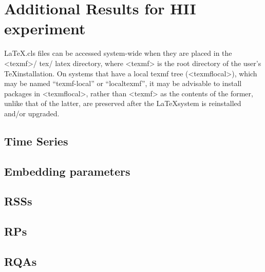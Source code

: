 \chapter{Additional Results for HII experiment} \label{appendix:d}



\LaTeX .cls  files can be accessed system-wide when they are placed in the
<texmf>/ tex/ latex directory, where <texmf> is the root directory of the user’s
\TeX installation.
On systems that have a local texmf tree (<texmflocal>), which
may be named ``texmf-local'' or ``localtexmf'', it may be advisable to install
packages in <texmflocal>, rather than <texmf> as the contents of the former,
unlike that of the latter, are preserved after the \LaTeX system is reinstalled
and/or upgraded.


\section{Time Series} \label{appendix:d:ts}
\section{Embedding parameters} \label{appendix:d:ep}
\section{RSSs} \label{appendix:d:rsss}
\section{RPs} \label{appendix:d:rps}
\section{RQAs} \label{appendix:d:rpas}



